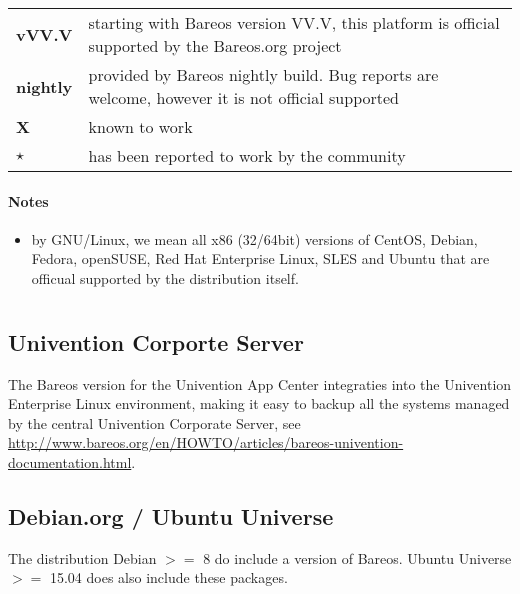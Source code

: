 \begin{tabular}[h]{l l}
\textbf{vVV.V}   & starting with Bareos version VV.V, this platform is official supported by the Bareos.org project \\
\textbf{nightly} & provided by Bareos nightly build. Bug reports are welcome, however it is not official supported \\
\textbf{X}       & known to work \\
\textbf{$\star$} & has been reported to work by the community\\
\end{tabular}


\paragraph{Notes}

\begin{itemize}
    \item by GNU/Linux, we mean all x86 (32/64bit) versions of CentOS, Debian, Fedora, openSUSE, Red Hat Enterprise Linux, SLES and Ubuntu that are officual supported  by the distribution itself.
\end{itemize}

\section{}

\subsection{Univention Corporte Server}
The Bareos version for the Univention App Center integraties into the Univention Enterprise Linux environment, making it easy to backup all the systems managed by the central Univention Corporate Server, see \url{http://www.bareos.org/en/HOWTO/articles/bareos-univention-documentation.html}.


\subsection{Debian.org / Ubuntu Universe}
\label{sec:DebianOrg}

The distribution Debian $>=$ 8 do include a version of Bareos.
Ubuntu Universe $>=$ 15.04 does also include these packages. 

